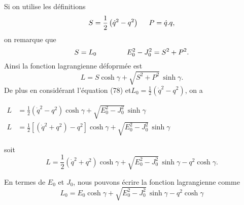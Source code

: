 \documentclass[12pt,a4paper, openany]{article}
\begin{document}
    	\hspace{0.5cm} Si on utilise les définitions 
    	\begin{equation}
    		S=\frac{1}{2}\left(\dot{q}^{2}-q^{2}\right) \hspace{0.5cm} P=\dot{q}.q ,
    	\end{equation}
    	on remarque que 
    	\begin{equation}
    		S=L_0 \hspace{1.5cm} E^2_0-J_0^2=S^2+P^2 .
    	\end{equation}
    	Ainsi la fonction lagrangienne défoprmée est 
    	\begin{equation}
    		L=S\cosh{\gamma}+\sqrt{S^2+P^2}\,\sinh{\gamma} .
    	\end{equation}
    	De plus en considérant l'équation (78) et$L_0=\frac{1}{2}\left(\dot{q}^{2}-q^{2}\right)$, on a \\
    \begin{center}
   	$\left.\begin{aligned}
    		L&=\frac{1}{2}\left(\dot{q}^{2}-q^{2}\right)\cosh{\gamma}+\sqrt{E^2_0-J_0^2}\,\sinh{\gamma}\\
    	L&=\frac{1}{2}\left[\left(\dot{q}^{2}+q^{2}\right)-q^{2}\right]\cosh{\gamma}+\sqrt{E^2_0-J_0^2}\,\sinh{\gamma}
    	\end{aligned}\right.$
    \end{center}
    soit 
    \begin{equation}
    L=\frac{1}{2}\left(\dot{q}^{2}+q^{2}\right)\cosh{\gamma}+\sqrt{E^2_0-J_0^2}\,\sinh{\gamma}-q^{2}\cosh{\gamma}.	
    \end{equation}
   
    En termes de $E_0$ et $J_0$, nous pouvons écrire la fonction lagrangienne comme 
    \begin{equation}
    L_0=E_0\cosh{\gamma}+\sqrt{E^2_0-J_0^2}\,\sinh{\gamma}-q^{2}\cosh{\gamma}	
    \end{equation}
\end{document}
